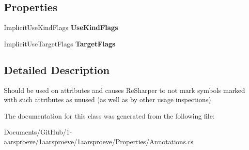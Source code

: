 \subsection*{Properties}
\begin{DoxyCompactItemize}
\item 
\hypertarget{class_means_implicit_use_attribute_af242c18a9e6e8db8d83c212231b1cd8c}{}Implicit\+Use\+Kind\+Flags {\bfseries Use\+Kind\+Flags}\label{class_means_implicit_use_attribute_af242c18a9e6e8db8d83c212231b1cd8c}

\item 
\hypertarget{class_means_implicit_use_attribute_abf0718c3b739197f26771fb693f280ac}{}Implicit\+Use\+Target\+Flags {\bfseries Target\+Flags}\label{class_means_implicit_use_attribute_abf0718c3b739197f26771fb693f280ac}

\end{DoxyCompactItemize}


\subsection{Detailed Description}
Should be used on attributes and causes Re\+Sharper to not mark symbols marked with such attributes as unused (as well as by other usage inspections) 



The documentation for this class was generated from the following file\+:\begin{DoxyCompactItemize}
\item 
Documents/\+Git\+Hub/1-\/aarsproeve/1aarsproeve/1aarsproeve/\+Properties/Annotations.\+cs\end{DoxyCompactItemize}
